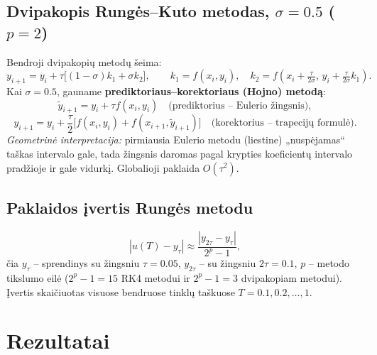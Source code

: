 \documentclass[12pt,a4paper]{article}
\begin{document}
\subsection{Dvipakopis Rungės--Kuto metodas, $\sigma=0.5$ ($p=2$)}
Bendroji dvipakopių metodų šeima:
\[
  y_{i+1}=y_i+\tau\big[(1-\sigma)k_1+\sigma k_2\big],\qquad
  k_1=f(x_i,y_i),\quad
  k_2=f\!\left(x_i+\tfrac{\tau}{2\sigma},\,y_i+\tfrac{\tau}{2\sigma}k_1\right).
\]
Kai $\sigma=0.5$, gauname \textbf{prediktoriaus--korektoriaus (Hojno) metodą}:
\[
  \tilde y_{i+1}=y_i+\tau f(x_i,y_i)\quad\text{(prediktorius -- Eulerio žingsnis)},
\]
\[
  y_{i+1}=y_i+\frac{\tau}{2}\Big[f(x_i,y_i)+f(x_{i+1},\tilde y_{i+1})\Big]
  \quad\text{(korektorius -- trapecijų formulė)}.
\]
\emph{Geometrinė interpretacija:} pirmiausia Eulerio metodu (liestine) „nuspėjamas“ taškas
intervalo gale, tada žingsnis daromas pagal krypties koeficientų intervalo pradžioje ir gale
vidurkį. Globalioji paklaida $O(\tau^2)$.

\subsection{Paklaidos įvertis Rungės metodu}
\[
  |u(T)-y_\tau|\approx\frac{|y_{2\tau}-y_\tau|}{2^p-1},
\]
čia $y_\tau$ -- sprendinys su žingsniu $\tau=0.05$, $y_{2\tau}$ -- su žingsniu $2\tau=0.1$,
$p$ -- metodo tikslumo eilė ($2^p-1=15$ RK4 metodui ir $2^p-1=3$ dvipakopiam metodui).
Įvertis skaičiuotas visuose bendruose tinklų taškuose $T=0.1,0.2,\dots,1$.

\section{Rezultatai}
\end{document}

